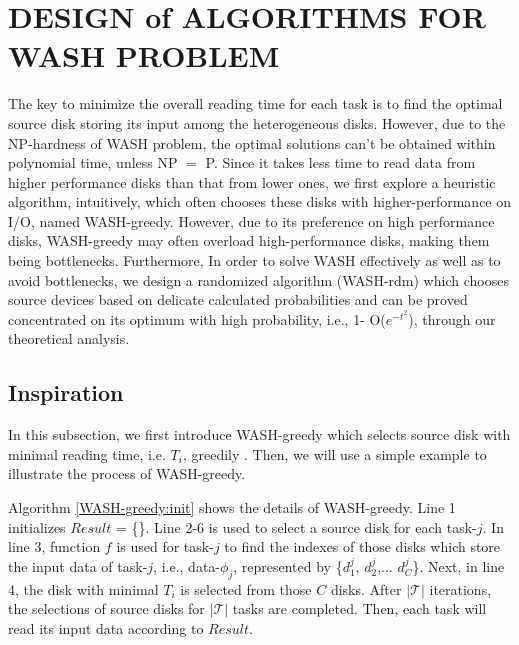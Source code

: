 \documentclass[conference]{IEEEtran}
\begin{document}
\section{DESIGN of ALGORITHMS FOR WASH PROBLEM}\label{DESIGN_ALGORITHM}

The key to minimize the overall reading time for each task is to find the optimal source disk storing its input among the heterogeneous disks. However, due to the NP-hardness of WASH problem, the optimal solutions can't be obtained within polynomial time, unless NP $=$ P. Since it takes less time to read data from higher performance disks than that from lower ones, we first explore a heuristic algorithm, intuitively, which often chooses these disks with higher-performance on I/O, named WASH-greedy. However, due to its preference on high performance disks, WASH-greedy may often overload high-performance disks, making them being bottlenecks. 
Furthermore, In order to solve WASH effectively as well as to avoid bottlenecks, we design a randomized algorithm (WASH-rdm) which chooses source devices based on delicate calculated probabilities and can be proved concentrated on its optimum with high probability, i.e., 1- O($e^{-t^2}$), through our theoretical analysis.

\subsection{Inspiration}\label{Heuristic}
In this subsection, we first introduce WASH-greedy which selects source disk with minimal reading time, i.e. $T_i$, greedily . Then, we will use a simple example to illustrate the process of WASH-greedy. %



Algorithm \ref{WASH-greedy:init} shows the details of WASH-greedy. Line 1 initializes $Result$ = \{\}. Line 2-6 is used to select a source disk for each task-$j$. In line 3, function $f$ is used for task-$j$ to find the indexes of those disks which store the input data of task-$j$, i.e., data-$\phi_j$, represented by \{$d_{1}^j$, $d_{2}^j$,... $d_{C}^j$\}. Next, in line 4, the disk with minimal $T_i$ is selected from those $C$ disks. After $\mathcal{|T|}$ iterations, the selections of source disks for $\mathcal{|T|}$ tasks are completed. Then, each task will read its input data according to $Result$.
\end{document}
